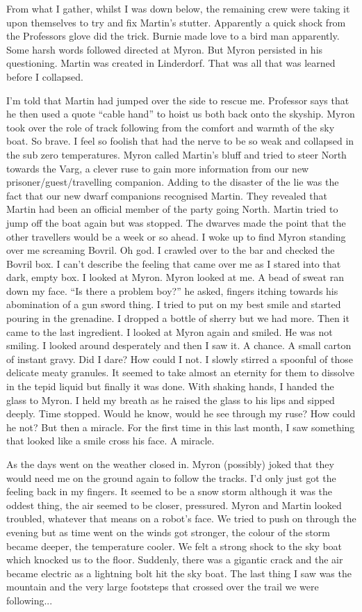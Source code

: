 From what I gather, whilst I was down below, the remaining crew were taking it upon themselves to try and fix Martin’s stutter. Apparently a quick shock from the Professors glove did the trick. Burnie made love to a bird man apparently. Some harsh words followed directed at Myron. But Myron persisted in his questioning. Martin was created in Linderdorf. That was all that was learned before I collapsed.\medskip

I’m told that Martin had jumped over the side to rescue me. Professor says that he then used a quote “cable hand” to hoist us both back onto the skyship. Myron took over the role of track following from the comfort and warmth of the sky boat. So brave. I feel so foolish that had the nerve to be so weak and collapsed in the sub zero temperatures. Myron called Martin’s bluff and tried to steer North towards the Varg, a clever ruse to gain more information from our new prisoner/guest/travelling companion. Adding to the disaster of the lie was the fact that our new dwarf companions recognised Martin. They revealed that Martin had been an official member of the party going North. Martin tried to jump off the boat again but was stopped. The dwarves made the point that the other travellers would be a week or so ahead. I woke up to find Myron standing over me screaming Bovril. Oh god. I crawled over to the bar and checked the Bovril box. I can’t describe the feeling that came over me as I stared into that dark, empty box. I looked at Myron. Myron looked at me. A bead of sweat ran down my face. “Is there a problem boy?” he asked, fingers itching towards his abomination of a gun sword thing. I tried to put on my best smile and started pouring in the grenadine. I dropped a bottle of sherry but we had more. Then it came to the last ingredient. I looked at Myron again and smiled. He was not smiling. I looked around desperately and then I saw it. A chance. A small carton of instant gravy. Did I dare? How could I not. I slowly stirred a spoonful of those delicate meaty granules. It seemed to take almost an eternity for them to dissolve in the tepid liquid but finally it was done. With shaking hands, I handed the glass to Myron. I held my breath as he raised the glass to his lips and sipped deeply. Time stopped. Would he know, would he see through my ruse? How could he not? But then a miracle. For the first time in this last month, I saw something that looked like a smile cross his face. A miracle.\medskip

As the days went on the weather closed in. Myron (possibly) joked that they would need me on the ground again to follow the tracks. I’d only just got the feeling back in my fingers. It seemed to be a snow storm although it was the oddest thing, the air seemed to be closer, pressured. Myron and Martin looked troubled, whatever that means on a robot’s face. We tried to push on through the evening but as time went on the winds got stronger, the colour of the storm became deeper, the temperature cooler. We felt a strong shock to the sky boat which knocked us to the floor. Suddenly, there was a gigantic crack and the air became electric as a lightning bolt hit the sky boat. The last thing I saw was the mountain and the very large footsteps that crossed over the trail we were following...\medskip

